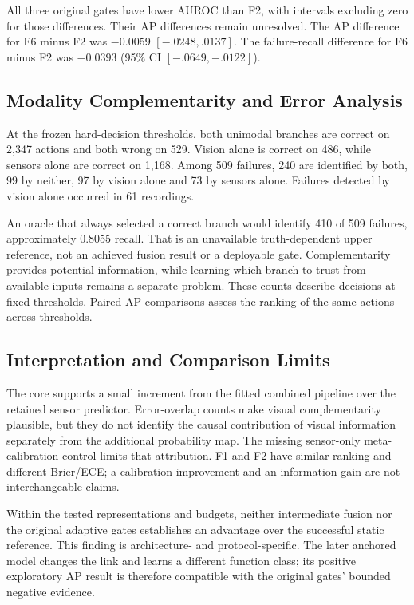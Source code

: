 All three original gates have lower AUROC than F2, with intervals excluding zero for those differences. Their AP differences remain unresolved. The AP difference for F6 minus F2 was $-0.0059$ $[-.0248,.0137]$. The failure-recall difference for F6 minus F2 was $-0.0393$ (95\% CI $[-.0649,-.0122]$).

\subsection{Modality Complementarity and Error Analysis}
At the frozen hard-decision thresholds, both unimodal branches are correct on 2,347 actions and both wrong on 529. Vision alone is correct on 486, while sensors alone are correct on 1,168. Among 509 failures, 240 are identified by both, 99 by neither, 97 by vision alone and 73 by sensors alone. Failures detected by vision alone occurred in 61 recordings.

An oracle that always selected a correct branch would identify 410 of 509 failures, approximately 0.8055 recall. That is an unavailable truth-dependent upper reference, not an achieved fusion result or a deployable gate. Complementarity provides potential information, while learning which branch to trust from available inputs remains a separate problem. These counts describe decisions at fixed thresholds. Paired AP comparisons assess the ranking of the same actions across thresholds.

\subsection{Interpretation and Comparison Limits}
The core supports a small increment from the fitted combined pipeline over the retained sensor predictor. Error-overlap counts make visual complementarity plausible, but they do not identify the causal contribution of visual information separately from the additional probability map. The missing sensor-only meta-calibration control limits that attribution. F1 and F2 have similar ranking and different Brier/ECE; a calibration improvement and an information gain are not interchangeable claims.

Within the tested representations and budgets, neither intermediate fusion nor the original adaptive gates establishes an advantage over the successful static reference. This finding is architecture- and protocol-specific. The later anchored model changes the link and learns a different function class; its positive exploratory AP result is therefore compatible with the original gates' bounded negative evidence.

